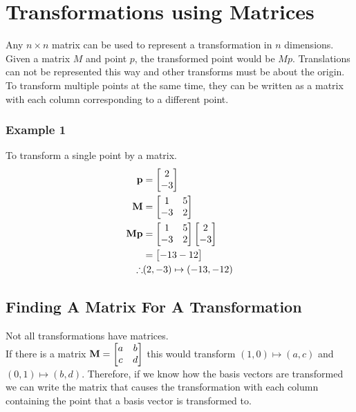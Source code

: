 \documentclass[class=article, crop=false]{standalone}
\begin{document}
\section*{Transformations using Matrices}
Any $n \times n$ matrix can be used to represent a transformation in $n$ dimensions. Given a matrix $M$ and point $p$, the transformed point would be $Mp$. Translations can not be represented this way and other transforms must be about the origin. To transform multiple points at the same time, they can be written as a matrix with each column corresponding to a different point.
\subsubsection*{Example 1}
To transform a single point by a matrix. 
\begin{align*}
\bold{p} & = \begin{bmatrix} 2 \\ -3 \\ \end{bmatrix} \\
\bold{M} & = \begin{bmatrix} 
	1 & 5 \\
	-3 & 2 \\
\end{bmatrix} \\
\bold{Mp} & = \begin{bmatrix} 
	1 & 5 \\
	-3 & 2 \\
\end{bmatrix}
\begin{bmatrix} 2 \\ -3 \\ \end{bmatrix} \\
& = \begin{bmatrix} -13 -12 \end{bmatrix} \\
\therefore & (2, -3) \mapsto (-13, -12) \\
\end{align*}
\subsection*{Finding A Matrix For A Transformation}
Not all transformations have matrices. \\

If there is a matrix $\bold{M} = \begin{bmatrix} a & b \\ c & d \end{bmatrix}$ this would transform $(1,0) \mapsto (a, c)$ and $(0,1) \mapsto (b,d)$. Therefore, if we know how the basis vectors are transformed we can write the matrix that causes the transformation with each column containing the point that a basis vector is transformed to. 
\end{document}
